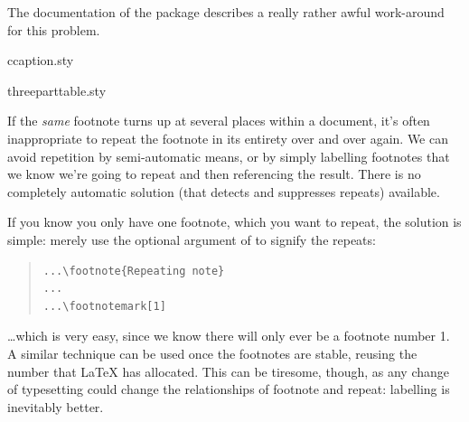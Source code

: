 The documentation of the  package describes a really
rather awful work-around for this problem.
\begin{ctanrefs}
\item[ccaption.sty]
\item[threeparttable.sty]
\end{ctanrefs}


If the \emph{same} footnote turns up at several places within a
document, it's often inappropriate to repeat the footnote in its
entirety over and over again.  We can avoid repetition by
semi-automatic means, or by simply labelling footnotes that we know
we're going to repeat and then referencing the result.  There is no
completely automatic solution (that detects and suppresses repeats)
available.

If you know you only have one footnote, which you want to repeat, the
solution is simple: merely use the optional argument of
 to signify the repeats:
\begin{quote}
\begin{verbatim}
...\footnote{Repeating note}
...
...\footnotemark[1]
\end{verbatim}
\end{quote}
\dots{}\@ which is very easy, since we know there will only ever be a
footnote number 1.  A similar technique can be used once the footnotes
are stable, reusing the number that \LaTeX{} has allocated.  This can
be tiresome, though, as any change of typesetting could change the
relationships of footnote and repeat: labelling is inevitably better.

